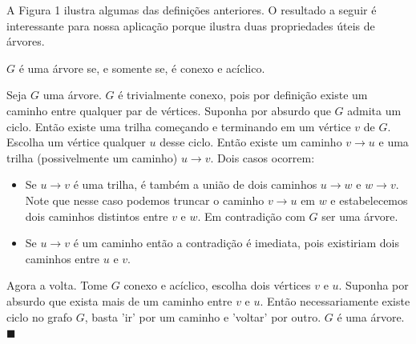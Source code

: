 A Figura 1 ilustra algumas das definições anteriores. O resultado a seguir é interessante para nossa aplicação porque ilustra duas propriedades úteis de árvores.

\begin{teo}
$G$ é uma árvore se, e somente se, é conexo e acíclico.
\end{teo}

\begin{prova}

Seja $G$ uma árvore. $G$ é trivialmente conexo, pois por definição existe um caminho entre qualquer par de vértices. Suponha por absurdo que $G$ admita um ciclo. Então existe uma trilha começando e terminando em um vértice $v$ de $G$. Escolha um vértice qualquer $u$ desse ciclo. Então existe um caminho $v \to u $ e uma trilha (possivelmente um caminho) $u \to v$. Dois casos ocorrem:

\begin{itemize}
    \item Se $u \to v$ é uma trilha, é também a união de dois caminhos $u \to w$ e $w \to v$. Note que nesse caso podemos truncar o caminho $v \to u$ em $w$ e estabelecemos dois caminhos distintos entre $v$ e $w$. Em contradição com $G$ ser uma árvore.

    \item Se $u \to v$ é um caminho então a contradição é imediata, pois existiriam dois caminhos entre $u$ e $v$.
\end{itemize}


Agora a volta. Tome $G$ conexo e acíclico, escolha dois vértices $v$ e $u$. Suponha por absurdo que exista mais de um caminho entre $v$ e $u$. Então necessariamente existe ciclo no grafo $G$, basta 'ir' por um caminho e 'voltar' por outro. $G$ é uma árvore.
$\blacksquare$
\end{prova}






